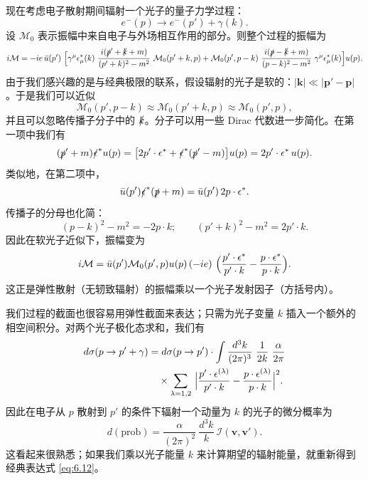 现在考虑电子散射期间辐射一个光子的量子力学过程：
\begin{equation}
  e^{-}(p) \to e^{-}(p') + \gamma(k) .
\end{equation}
设 $\mathcal{M}_0$ 表示振幅中来自电子与外场相互作用的部分。则整个过程的振幅为
\begin{equation}
  i\mathcal{M} = -ie\,\bar{u}(p')\ \Bigl[
    \gamma^\mu\epsilon^{*}_\mu(k)\ \frac{i(\slashed{p}'+\slashed{k}+m)}
      {(p'+k)^2-m^2}\ \mathcal{M}_0(p'+k, p)
    + \mathcal{M}_0(p', p-k)\ \frac{i(\slashed{p}-\slashed{k}+m)}
      {(p-k)^2-m^2}\ \gamma^\mu\epsilon^{*}_\mu(k) \Bigr] u(p) .
  \label{eq:6.20}
\end{equation}
由于我们感兴趣的是与经典极限的联系，假设辐射的光子是软的：$|\mathbf{k}| \ll |\mathbf{p}'-\mathbf{p}|$。于是我们可以近似
\begin{equation}
  \mathcal{M}_0(p', p-k) \approx \mathcal{M}_0(p'+k, p)
    \approx \mathcal{M}_0(p', p),
  \label{eq:6.21}
\end{equation}
并且可以忽略传播子分子中的 $\slashed{k}$。分子可以用一些 Dirac 代数进一步简化。在第一项中我们有
\begin{equation}
  (\slashed{p}'+m)\slashed{\epsilon}^{*}u(p) = \bigl[
    2p'\cdot\epsilon^{*} + \slashed{\epsilon}^{*}(\slashed{p}'-m) \bigr]u(p)
    = 2p'\cdot\epsilon^{*}\, u(p) .
\end{equation}
类似地，在第二项中，
\begin{equation}
  \bar{u}(p')\slashed{\epsilon}^{*}(\slashed{p}+m) = \bar{u}(p')\,2p\cdot\epsilon^{*}.
\end{equation}
传播子的分母也化简：
\begin{equation}
  (p-k)^2 - m^2 = -2p\cdot k;\qquad
  (p'+k)^2 - m^2 = 2p'\cdot k .
\end{equation}
因此在软光子近似下，振幅变为
\begin{equation}
  i\mathcal{M} = \bar{u}(p')\mathcal{M}_0(p',p)u(p)\,
    (-ie)\ \Bigl( \frac{p'\cdot\epsilon^{*}}{p'\cdot k}
      - \frac{p\cdot\epsilon^{*}}{p\cdot k} \Bigr).
  \label{eq:6.22}
\end{equation}
这正是弹性散射（无轫致辐射）的振幅乘以一个光子发射因子（方括号内）。

我们过程的截面也很容易用弹性截面来表达；只需为光子变量 $k$ 插入一个额外的相空间积分。对两个光子极化态求和，我们有
\begin{equation}
  \begin{aligned}
    d\sigma(p\to p' + \gamma) &= d\sigma(p\to p')\cdot
      \int \frac{d^3k}{(2\pi)^3}\ \frac{1}{2k}\ \frac{\alpha}{2\pi}\\
    &\quad \times \sum_{\lambda=1,2}\ \Bigl|
      \frac{p'\cdot\epsilon^{(\lambda)}}{p'\cdot k}
      - \frac{p\cdot\epsilon^{(\lambda)}}{p\cdot k} \Bigr|^2 .
  \end{aligned}
  \label{eq:6.23}
\end{equation}
因此在电子从 $p$ 散射到 $p'$ 的条件下辐射一个动量为 $k$ 的光子的微分概率为
\begin{equation}
  d(\mathrm{prob}) = \frac{\alpha}{(2\pi)^2}\ \frac{d^3k}{k}\
    \mathcal{I}(\mathbf{v},\mathbf{v}') .
  \label{eq:6.24}
\end{equation}
这看起来很熟悉；如果我们乘以光子能量 $k$ 来计算期望的辐射能量，就重新得到经典表达式 \eqref{eq:6.12}。

